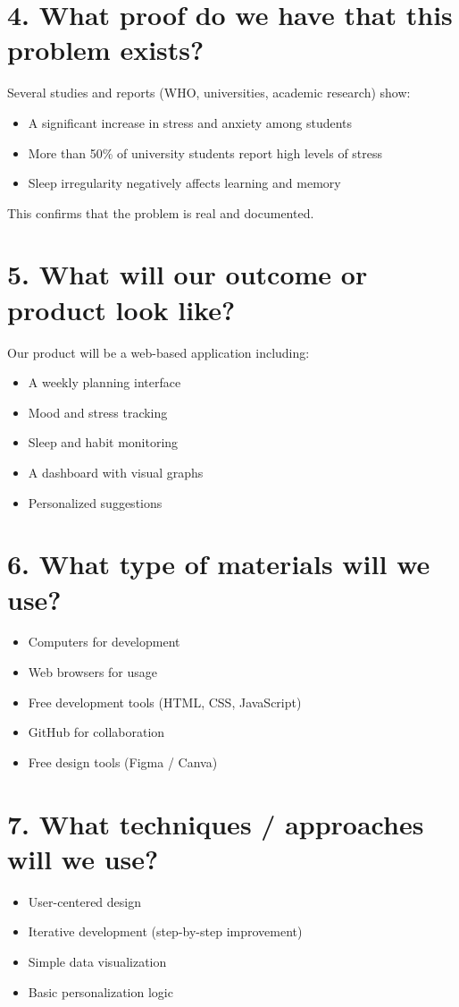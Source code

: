 \documentclass[11pt,a4paper]{article}
\begin{document}
\section*{4. What proof do we have that this problem exists?}
Several studies and reports (WHO, universities, academic research) show:
\begin{itemize}
  \item A significant increase in stress and anxiety among students
  \item More than 50\% of university students report high levels of stress
  \item Sleep irregularity negatively affects learning and memory
\end{itemize}
This confirms that the problem is real and documented.

\section*{5. What will our outcome or product look like?}
Our product will be a web-based application including:
\begin{itemize}
  \item A weekly planning interface
  \item Mood and stress tracking
  \item Sleep and habit monitoring
  \item A dashboard with visual graphs
  \item Personalized suggestions
\end{itemize}

\section*{6. What type of materials will we use?}
\begin{itemize}
  \item Computers for development
  \item Web browsers for usage
  \item Free development tools (HTML, CSS, JavaScript)
  \item GitHub for collaboration
  \item Free design tools (Figma / Canva)
\end{itemize}

\section*{7. What techniques / approaches will we use?}
\begin{itemize}
  \item User-centered design
  \item Iterative development (step-by-step improvement)
  \item Simple data visualization
  \item Basic personalization logic
\end{itemize}
\end{document}
